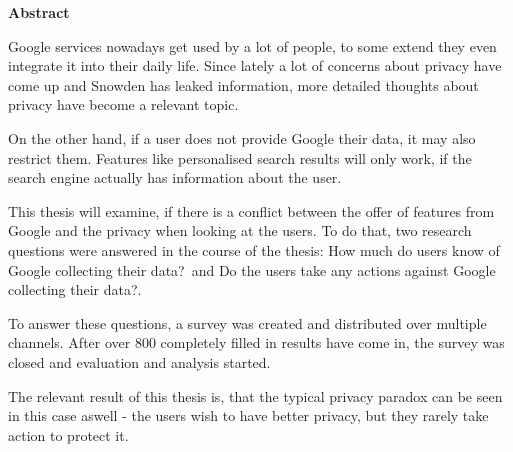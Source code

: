 \vspace{2em}
\begin{center}
	\begin{large}
		\textbf{Abstract}
	\end{large}
\end{center}
\vspace{0.75em}
Google services nowadays get used by a lot of people, to some extend they even integrate it into their daily life.  Since lately a lot of concerns about privacy have come up and Snowden has leaked information, more detailed thoughts about privacy have become a relevant topic.

On the other hand, if a user does not provide Google their data, it may also restrict them. Features like personalised search results will only work, if the search engine actually has information about the user.

This thesis will examine, if there is a conflict between the offer of features from Google and the privacy when looking at the users. To do that, two research questions were answered in the course of the thesis: \glqq How much do users know of Google collecting their data?\grqq\ and \glqq Do the users take any actions against Google collecting their data?\grqq .

To answer these questions, a survey was created and distributed over multiple channels. After over 800 completely filled in results have come in, the survey was closed and evaluation and analysis started.

The relevant result of this thesis is, that the typical privacy paradox can be seen in this case aswell - the users wish to have better privacy, but they rarely take action to protect it.